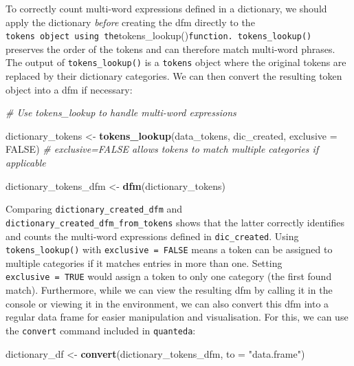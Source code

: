 \documentclass[
]{book}
\newenvironment{Shaded}{\begin{snugshade}}{\end{snugshade}}
\newcommand{\AttributeTok}[1]{\textcolor[rgb]{0.13,0.29,0.53}{#1}}
\newcommand{\CommentTok}[1]{\textcolor[rgb]{0.56,0.35,0.01}{\textit{#1}}}
\newcommand{\ConstantTok}[1]{\textcolor[rgb]{0.56,0.35,0.01}{#1}}
\newcommand{\FunctionTok}[1]{\textcolor[rgb]{0.13,0.29,0.53}{\textbf{#1}}}
\newcommand{\NormalTok}[1]{#1}
\newcommand{\OtherTok}[1]{\textcolor[rgb]{0.56,0.35,0.01}{#1}}
\newcommand{\StringTok}[1]{\textcolor[rgb]{0.31,0.60,0.02}{#1}}
\begin{document}
To correctly count multi-word expressions defined in a dictionary, we should apply the dictionary \emph{before} creating the dfm directly to the \texttt{tokens\textquotesingle{}\ object\ using\ the}tokens\_lookup()\texttt{function.\ tokens\_lookup()} preserves the order of the tokens and can therefore match multi-word phrases. The output of \texttt{tokens\_lookup()} is a \texttt{tokens} object where the original tokens are replaced by their dictionary categories. We can then convert the resulting token object into a dfm if necessary:

\begin{Shaded}
\begin{Highlighting}[]
\CommentTok{\# Use tokens\_lookup to handle multi{-}word expressions}

\NormalTok{dictionary\_tokens }\OtherTok{\textless{}{-}} \FunctionTok{tokens\_lookup}\NormalTok{(data\_tokens, dic\_created, }\AttributeTok{exclusive =} \ConstantTok{FALSE}\NormalTok{)  }\CommentTok{\# exclusive=FALSE allows tokens to match multiple categories if applicable}

\NormalTok{dictionary\_tokens\_dfm }\OtherTok{\textless{}{-}} \FunctionTok{dfm}\NormalTok{(dictionary\_tokens)}
\end{Highlighting}
\end{Shaded}

Comparing \texttt{dictionary\_created\_dfm} and \texttt{dictionary\_created\_dfm\_from\_tokens} shows that the latter correctly identifies and counts the multi-word expressions defined in \texttt{dic\_created}. Using \texttt{tokens\_lookup()} with \texttt{exclusive\ =\ FALSE} means a token can be assigned to multiple categories if it matches entries in more than one. Setting \texttt{exclusive\ =\ TRUE} would assign a token to only one category (the first found match). Furthermore, while we can view the resulting dfm by calling it in the console or viewing it in the environment, we can also convert this dfm into a regular data frame for easier manipulation and visualisation. For this, we can use the \texttt{convert} command included in \texttt{quanteda}:

\begin{Shaded}
\begin{Highlighting}[]
\NormalTok{dictionary\_df }\OtherTok{\textless{}{-}} \FunctionTok{convert}\NormalTok{(dictionary\_tokens\_dfm, }\AttributeTok{to =} \StringTok{"data.frame"}\NormalTok{)}
\end{Highlighting}
\end{Shaded}
\end{document}
